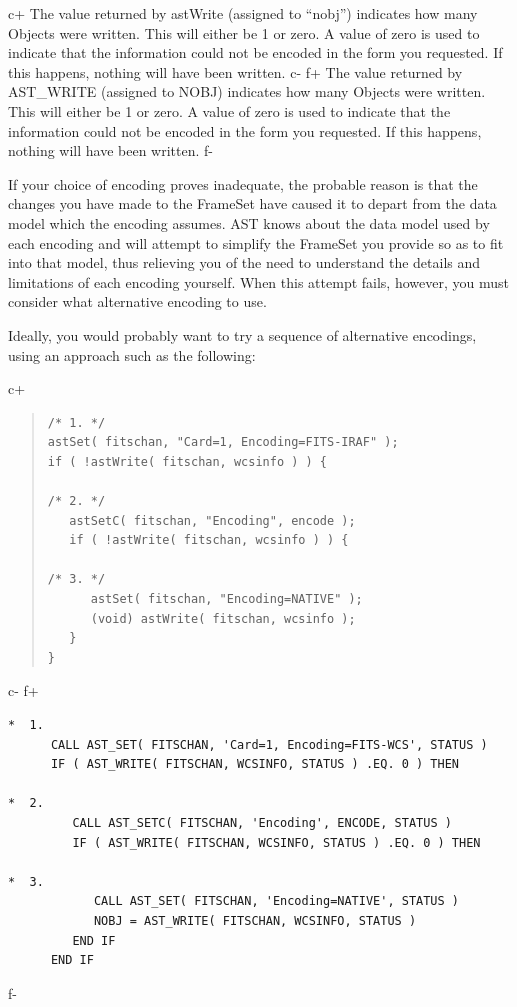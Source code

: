 \documentclass[twoside,11pt]{article}
\begin{document}
c+
The value returned by astWrite (assigned to ``nobj'') indicates how
many Objects were written. This will either be 1 or zero. A value of
zero is used to indicate that the information could not be encoded in
the form you requested. If this happens, nothing will have been
written.
c-
f+
The value returned by AST\_WRITE (assigned to NOBJ) indicates how many
Objects were written. This will either be 1 or zero. A value of zero
is used to indicate that the information could not be encoded in the
form you requested. If this happens, nothing will have been written.
f-

If your choice of encoding proves inadequate, the probable reason is
that the changes you have made to the FrameSet have caused it to
depart from the data model which the encoding assumes.  AST knows
about the data model used by each encoding and will attempt to
simplify the FrameSet you provide so as to fit into that model, thus
relieving you of the need to understand the details and limitations of
each encoding yourself. When this attempt fails, however, you must
consider what alternative encoding to use.

Ideally, you would probably want to try a sequence of alternative
encodings, using an approach such as the following:

c+
\begin{quote}
\small
\begin{verbatim}
/* 1. */
astSet( fitschan, "Card=1, Encoding=FITS-IRAF" );
if ( !astWrite( fitschan, wcsinfo ) ) {

/* 2. */
   astSetC( fitschan, "Encoding", encode );
   if ( !astWrite( fitschan, wcsinfo ) ) {

/* 3. */
      astSet( fitschan, "Encoding=NATIVE" );
      (void) astWrite( fitschan, wcsinfo );
   }
}
\end{verbatim}
\normalsize
\end{quote}
c-
f+
\small
\begin{verbatim}
*  1.
      CALL AST_SET( FITSCHAN, 'Card=1, Encoding=FITS-WCS', STATUS )
      IF ( AST_WRITE( FITSCHAN, WCSINFO, STATUS ) .EQ. 0 ) THEN

*  2.
         CALL AST_SETC( FITSCHAN, 'Encoding', ENCODE, STATUS )
         IF ( AST_WRITE( FITSCHAN, WCSINFO, STATUS ) .EQ. 0 ) THEN

*  3.
            CALL AST_SET( FITSCHAN, 'Encoding=NATIVE', STATUS )
            NOBJ = AST_WRITE( FITSCHAN, WCSINFO, STATUS )
         END IF
      END IF
\end{verbatim}
\normalsize
f-
\end{document}
